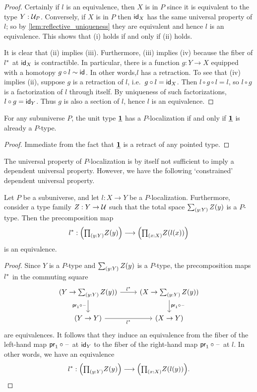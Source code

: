 \begin{proof}
  Certainly if $l$ is an equivalence, then $X$ is in $P$ since it is equivalent to the type $Y:\UU_P$.
  Conversely, if $X$ is in $P$ then $\idfunc[X]$ has the same universal property of $l$; so by \cref{lem:reflective_uniqueness} they are equivalent and hence $l$ is an equivalence. This shows that (i) holds if and only if (ii) holds.

  It is clear that (ii) implies (iii). Furthermore, (iii) implies (iv) because the fiber of $\precomp{l}$ at $\idfunc[X]$ is contractible. In particular, there is a function $g:Y\to X$ equipped with a homotopy $g\circ l\htpy\idfunc$. In other words,$l$ has a retraction. To see that (iv) implies (ii), suppose $g$ is a retraction of $l$, i.e.\ $g\circ l = \idfunc[X]$.
  Then $l\circ g\circ l = l$, so $l\circ g$ is a factorization of $l$ through itself.
  By uniqueness of such factorizations, $l\circ g = \idfunc[Y]$.
  Thus $g$ is also a section of $l$, hence $l$ is an equivalence.
\end{proof}

\begin{cor}\label{cor:unit_local}
For any subuniverse $P$, the unit type $\unit$ has a $P$-localization if and only if $\unit$ is already a $P$-type.
\end{cor}

\begin{proof}
Immediate from the fact that $\unit$ is a retract of any pointed type.
\end{proof}

The universal property of $P$-localization is by itself not sufficient to imply a dependent universal property. However, we have the following `constrained' dependent universal property.

\begin{prp}\label{theorem:generalized-induction}
Let $P$ be a subuniverse, and let $l:X\to Y$ be a $P$-localization. Furthermore, consider a type family $Z:Y\to\UU$ such that the total space $\sm{y:Y}Z(y)$ is a $P$-type.
Then the precomposition map
\[
  \precomp{l} : \Big(\prd{y:Y}Z(y)\Big) \lra \Big(\prd{x:X}Z(l(x))\Big)
\]
is an equivalence.
\end{prp}

\begin{proof}
Since $Y$ is a $P$-type and $\sm{y:Y}Z(y)$ is a $P$-type, the precomposition maps $\precomp{l}$ in the commuting square
\[
  \begin{tikzcd}
    (Y\to \sm{y:Y}Z(y)) \arrow[r,"\precomp{l}"] \arrow[d,swap,"\proj 1\circ\blank"] & (X\to \sm{y:Y}Z(y)) \arrow[d,"\proj 1\circ\blank"] \\
    (Y\to Y) \arrow[r,swap,"\precomp{l}"] & (X\to Y)
  \end{tikzcd}
\]
are equivalences. It follows that they induce an equivalence from the fiber of the left-hand map $\proj 1\circ\blank$ at $\idfunc[Y]$ to the fiber of the right-hand map $\proj 1\circ\blank$ at $l$. In other words, we have an equivalence
\[
  \precomp{l} : \Big(\prd{y:Y}Z(y)\Big) \lra \Big(\prd{x:X}Z(l(y))\Big).\qedhere
\]
\end{proof}

